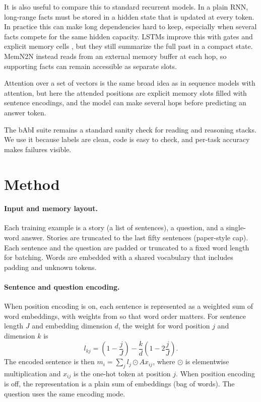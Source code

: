\documentclass{article}
\begin{document}
It is also useful to compare this to standard recurrent models. In a plain RNN, long-range facts must be stored in a hidden state that is updated at every token. In practice this can make long dependencies hard to keep, especially when several facts compete for the same hidden capacity. LSTMs improve this with gates and explicit memory cells \citep{hochreiter1997long}, but they still summarize the full past in a compact state. MemN2N instead reads from an external memory buffer at each hop, so supporting facts can remain accessible as separate slots.

Attention over a set of vectors is the same broad idea as in sequence models with attention, but here the attended positions are explicit memory slots filled with sentence encodings, and the model can make several hops before predicting an answer token.

The bAbI suite \citep{weston2015towards} remains a standard sanity check for reading and reasoning stacks. We use it because labels are clean, code is easy to check, and per-task accuracy makes failures visible.

\section{Method}

\paragraph{Input and memory layout.}
Each training example is a story (a list of sentences), a question, and a single-word answer. Stories are truncated to the last fifty sentences (paper-style cap). Each sentence and the question are padded or truncated to a fixed word length for batching. Words are embedded with a shared vocabulary that includes padding and unknown tokens.

\paragraph{Sentence and question encoding.}
When position encoding is on, each sentence is represented as a weighted sum of word embeddings, with weights from \citet{sukhbaatar2015end} so that word order matters. For sentence length $J$ and embedding dimension $d$, the weight for word position $j$ and dimension $k$ is
\[
l_{kj} = \left(1 - \frac{j}{J}\right) - \frac{k}{d}\left(1 - 2\frac{j}{J}\right).
\]
The encoded sentence is then $m_i = \sum_j l_j \odot A x_{ij}$, where $\odot$ is elementwise multiplication and $x_{ij}$ is the one-hot token at position $j$. When position encoding is off, the representation is a plain sum of embeddings (bag of words). The question uses the same encoding mode.
\end{document}
